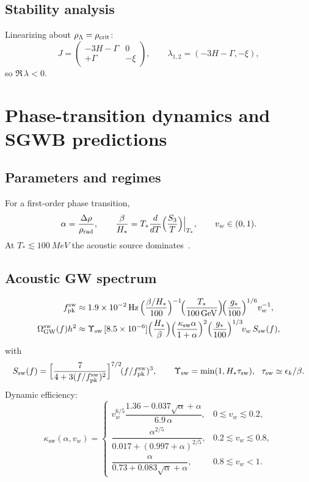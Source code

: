 \documentclass[preprint,aps,prd,onecolumn,nofootinbib,longbibliography]{revtex4-2}
\newcommand{\FOPT}{first-order phase transition}
\numberwithin{equation}{section}
\begin{document}
\subsection{Stability analysis}
\label{sec:stab}
Linearizing about $\rho_\Lambda=\rho_{\rm crit}$:
\begin{equation}
J=\begin{pmatrix}-3H-\Gamma & 0\\ +\Gamma & -\xi\end{pmatrix},
\qquad \lambda_{1,2}=(-3H-\Gamma,-\xi),
\end{equation}
so $\Re\,\lambda<0$.

\section{Phase-transition dynamics and SGWB predictions}
\label{sec:sgwb}

\subsection{Parameters and regimes}
\label{sec:params}
For a \FOPT,
\begin{equation}
\alpha=\frac{\Delta\rho}{\rho_{\rm rad}},\qquad
\frac{\beta}{H_*}=T_*\frac{d}{dT}\Big(\frac{S_3}{T}\Big)\Big|_{T_*},\qquad v_w\in(0,1).
\end{equation}
At $T_*\!\lesssim\!\SI{100}{MeV}$ the acoustic source dominates~\cite{Hindmarsh2014,Hindmarsh2015}.

\subsection{Acoustic GW spectrum}
\label{sec:acoustic}
\begin{align}
f_{\rm pk}^{\rm sw} &\approx 1.9\times10^{-2}\,\mathrm{Hz}\,
\Big(\frac{\beta/H_*}{100}\Big)^{-1}\!
\Big(\frac{T_*}{100\,\mathrm{GeV}}\Big)\!
\Big(\frac{g_*}{100}\Big)^{1/6} v_w^{-1}, \label{eq:fpk}\\
\Omega_{\mathrm{GW}}^{\mathrm{sw}}(f)h^2 &\approx
\Upsilon_{\mathrm{sw}}\,[8.5\times10^{-6}]
\Big(\frac{H_*}{\beta}\Big)
\Big(\frac{\kappa_{\mathrm{sw}}\alpha}{1+\alpha}\Big)^{2}
\Big(\frac{g_*}{100}\Big)^{1/3}\! v_w\, S_{\mathrm{sw}}(f), \label{eq:amp_sw}
\end{align}
with
\begin{equation}
S_{\mathrm{sw}}(f)=\Big[\frac{7}{4+3(f/f_{\rm pk}^{\rm sw})^{2}}\Big]^{7/2}\!(f/f_{\rm pk}^{\rm sw})^3,\qquad
\Upsilon_{\mathrm{sw}}=\min(1,H_*\tau_{\mathrm{sw}}),\ \ \tau_{\mathrm{sw}}\simeq \epsilon_k/\beta.
\end{equation}
Dynamic efficiency:
\begin{equation}
\kappa_{\mathrm{sw}}(\alpha,v_w)=
\begin{cases}
v_w^{6/5}\dfrac{1.36-0.037\sqrt{\alpha}+\alpha}{6.9\,\alpha}, & 0\!\lesssim\! v_w \!\lesssim\! 0.2,\\[4pt]
\dfrac{\alpha^{2/5}}{0.017+(0.997+\alpha)^{2/5}}, & 0.2\!\lesssim\! v_w \!\lesssim\! 0.8,\\[6pt]
\dfrac{\alpha}{0.73+0.083\sqrt{\alpha}+\alpha}, & 0.8\!\lesssim\! v_w \!<\! 1.
\end{cases}
\end{equation}
\end{document}
